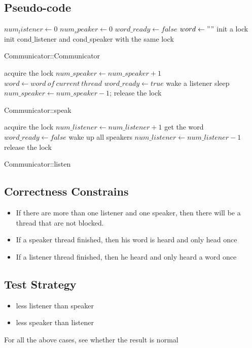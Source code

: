 \documentclass[a4paper,10pt]{article}
\begin{document}
\subsection {Pseudo-code}
\begin{algorithm}
$num_listener \gets 0$\;
$num_speaker \gets 0$\;
$word\_ready \gets false$\;
$word \gets ""$\;
init a lock\;
init cond$\_$listener and cond$\_$speaker with the same lock\;
\caption{Communicator::Communicator}
\end{algorithm}

\begin{algorithm}

acquire the lock\;
$num\_speaker \gets num\_speaker+1$\;
$word \gets word ~of~ current~ thread$\;
$word\_ready \gets true$\;
wake a listener\;
sleep\;
$num\_speaker\gets num\_speaker-1$;\;
release the lock\;
\caption{Communicator::speak}
\end{algorithm}

\begin{algorithm}

acquire the lock\;
$num\_listener\gets num\_listener+1$\;
get the word\;
$ word\_ready\gets false$\;
wake up all speakers\;
$ num\_listener\gets num\_listener-1$\;
release the lock
\caption{Communicator::listen}
\end{algorithm}

\subsection{Correctness Constrains}
\begin{itemize}
\item If there are more than one listener and one speaker, then there will be a thread that are not blocked.
\item If a speaker thread finished, then his word is heard and only head once
\item If a listener thread finished, then he heard and only heard a word once
\end{itemize}
\subsection {Test Strategy}
\begin{itemize}
\item less listener than speaker
\item less speaker than listener
\end{itemize}
For all the above cases, see whether the result is normal
\end{document}
